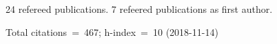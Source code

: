 24 refereed publications. 7 refeered publications as first author.

Total citations~=~467; h-index~=~10 (2018-11-14)